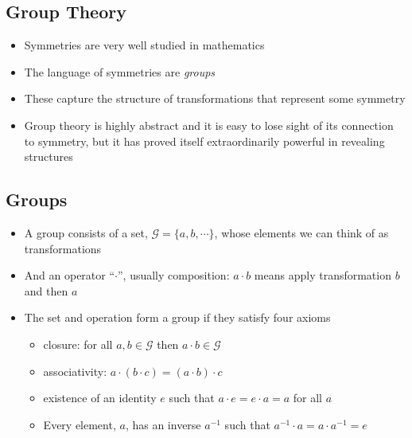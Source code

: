 \Outline %

\begin{slide}
\section{Group Theory}

\begin{PauseHighLight}
  \begin{itemize}
  \item Symmetries are very well studied in mathematics\pause
  \item The language of symmetries are \emph{groups}\pause
  \item These capture the structure of transformations that represent
    some symmetry\pause
  \item Group theory is highly abstract and it is easy to lose sight
    of its connection to symmetry, but it has proved itself
    extraordinarily powerful in revealing structures\pause
  \end{itemize}
\end{PauseHighLight}

\end{slide}


\begin{slide}
\section{Groups}

\begin{PauseHighLight}
  \begin{itemize}
  \item A group consists of a set, $\mathcal{G} = \{a,b,\cdots\}$, whose
    elements we can think of as transformations\pause
  \item And an operator ``$\cdot$'', usually composition: $a\cdot b$
    means apply transformation $b$ and then $a$\pause
  \item The set and operation form a group if they satisfy four axioms
    \begin{itemize}
    \item closure: for all $a, b \in \mathcal{G}$ then $a\cdot b \in \mathcal{G}$
    \item associativity: $a\cdot (b\cdot c) = (a\cdot b) \cdot c$
    \item existence of an identity $e$ such that $a\cdot e = e\cdot a
      = a$ for all $a$
    \item Every element, $a$, has an inverse $a^{-1}$ such that
      $a^{-1}\cdot a = a\cdot a^{-1} = e$\pause
    \end{itemize}
  \end{itemize}
\end{PauseHighLight}

\end{slide} 

